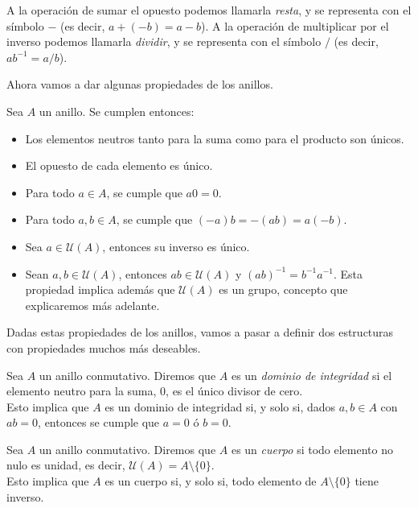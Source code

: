 A la operación de sumar el opuesto podemos llamarla \textit{resta}, y se representa con el símbolo $-$ (es decir, $a + (-b) = a - b$). A la operación de multiplicar por el inverso podemos llamarla \textit{dividir}, y se representa con el símbolo $/$ (es decir, $ab^{-1} = a/b$).

Ahora vamos a dar algunas propiedades de los anillos.

\begin{proposicion}
	Sea $A$ un anillo. Se cumplen entonces:
	
	\begin{itemize}
		\item Los elementos neutros tanto para la suma como para el producto son únicos.
		
		\item El opuesto de cada elemento es único.
		
		\item Para todo $a \in A$, se cumple que $a0 = 0$.
		
		\item Para todo $a, b \in A$, se cumple que $(-a)b = -(ab) = a(-b)$.
		
		\item Sea $a \in \mathcal{U}(A)$, entonces su inverso es único.
		
		\item Sean $a, b \in \mathcal{U}(A)$, entonces $ab \in \mathcal{U}(A)$ y $(ab)^{-1} = b^{-1}a^{-1}$. Esta propiedad implica además que $\mathcal{U}(A)$ es un grupo, concepto que explicaremos más adelante.
	\end{itemize}
\end{proposicion}

Dadas estas propiedades de los anillos, vamos a pasar a definir dos estructuras con propiedades muchos más deseables.

\begin{definicion}
	Sea $A$ un anillo conmutativo. Diremos que $A$ es un \textit{dominio de integridad} si el elemento neutro para la suma, $0$, es el único divisor de cero.\\
	
	Esto implica que $A$ es un dominio de integridad si, y solo si, dados $a, b \in A$ con $ab = 0$, entonces se cumple que $a = 0$ ó $b = 0$.
\end{definicion}

\begin{definicion}
	Sea $A$ un anillo conmutativo. Diremos que $A$ es un \textit{cuerpo} si todo elemento no nulo es unidad, es decir, $\mathcal{U}(A) = A \setminus \{0\}$.\\
	
	Esto implica que $A$ es un cuerpo si, y solo si, todo elemento de $A \setminus \{0\}$ tiene inverso.
\end{definicion}


